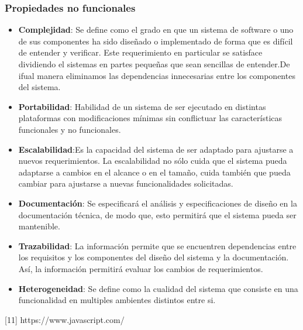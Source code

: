 \subsubsection{Propiedades no funcionales}
\begin{itemize}
	
	\item \textbf{Complejidad}: Se define como el grado en que un sistema de software o uno de sus componentes ha sido diseñado o implementado de forma que es difícil de entender y verificar. Este requerimiento en particular se satisface dividiendo el sistemas en partes pequeñas que sean sencillas de entender.De ifual manera eliminamos las dependencias innecesarias entre los componentes del sistema. 
	
	\item \textbf{Portabilidad}: Habilidad de un sistema de ser ejecutado en distintas plataformas con modificaciones mínimas sin conflictuar las características funcionales y no funcionales. 
	
	\item \textbf{Escalabilidad}:Es la capacidad del sistema de ser adaptado para ajustarse a nuevos requerimientos. La escalabilidad no sólo cuida que el sistema pueda adaptarse a cambios en el alcance o en el tamaño, cuida también que pueda cambiar para ajustarse a nuevas funcionalidades solicitadas.
	
	\item \textbf{Documentación}: Se especificará el análisis y especificaciones de diseño en la documentación técnica, de modo que, esto permitirá que el sistema pueda ser mantenible.
	
	\item \textbf{Trazabilidad}: La información permite que se encuentren dependencias entre los requisitos y los componentes del diseño del sistema y la documentación. Así, la información permitirá evaluar los cambios de requerimientos.
	
	\item \textbf{Heterogeneidad}: Se define como la cualidad del sistema que consiste en una funcionalidad en multiples ambientes distintos entre si.
\end{itemize}


[11]	https://www.javascript.com/